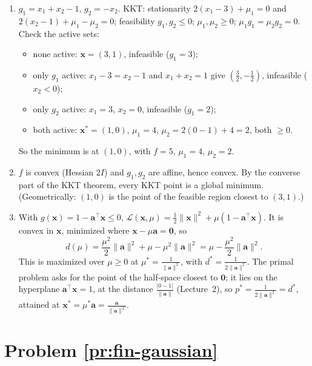 \documentclass[11pt]{article}
\newcommand{\norm}[1]{\lVert #1 \rVert}
\begin{document}
\begin{enumerate}[label=(\alph*)]
    \item $g_1 = x_1 + x_2 - 1$, $g_2 = -x_2$. KKT: stationarity $2(x_1 - 3) + \mu_1 = 0$ and $2(x_2 - 1) + \mu_1 - \mu_2 = 0$; feasibility $g_1, g_2 \leq 0$; $\mu_1, \mu_2 \geq 0$; $\mu_1g_1 = \mu_2g_2 = 0$. Check the active sets:
    \begin{itemize}
        \item none active: $\mathbf{x} = (3, 1)$, infeasible ($g_1 = 3$);
        \item only $g_1$ active: $x_1 - 3 = x_2 - 1$ and $x_1 + x_2 = 1$ give $(\frac{3}{2}, -\frac{1}{2})$, infeasible ($x_2 < 0$);
        \item only $g_2$ active: $x_1 = 3$, $x_2 = 0$, infeasible ($g_1 = 2$);
        \item both active: $\mathbf{x}^* = (1, 0)$, $\mu_1 = 4$, $\mu_2 = 2(0 - 1) + 4 = 2$, both $\geq 0$.
    \end{itemize}
    So the minimum is at $(1, 0)$, with $f = 5$, $\mu_1 = 4$, $\mu_2 = 2$.
    \item $f$ is convex (Hessian $2I$) and $g_1, g_2$ are affine, hence convex. By the converse part of the KKT theorem, every KKT point is a global minimum. (Geometrically: $(1, 0)$ is the point of the feasible region closest to $(3, 1)$.)
    \item With $g(\mathbf{x}) = 1 - \mathbf{a}^\top\mathbf{x} \leq 0$, $\mathcal{L}(\mathbf{x}, \mu) = \frac{1}{2}\norm{\mathbf{x}}^2 + \mu(1 - \mathbf{a}^\top\mathbf{x})$. It is convex in $\mathbf{x}$, minimized where $\mathbf{x} - \mu\mathbf{a} = \mathbf{0}$, so
    \[d(\mu) = \frac{\mu^2}{2}\norm{\mathbf{a}}^2 + \mu - \mu^2\norm{\mathbf{a}}^2 = \mu - \frac{\mu^2}{2}\norm{\mathbf{a}}^2.\]
    This is maximized over $\mu \geq 0$ at $\mu^* = \frac{1}{\norm{\mathbf{a}}^2}$, with $d^* = \frac{1}{2\norm{\mathbf{a}}^2}$. The primal problem asks for the point of the half-space closest to $\mathbf{0}$; it lies on the hyperplane $\mathbf{a}^\top\mathbf{x} = 1$, at the distance $\frac{|0 - 1|}{\norm{\mathbf{a}}}$ (Lecture~2), so $p^* = \frac{1}{2\norm{\mathbf{a}}^2} = d^*$, attained at $\mathbf{x}^* = \mu^*\mathbf{a} = \frac{\mathbf{a}}{\norm{\mathbf{a}}^2}$.
\end{enumerate}

\section*{Problem \ref{pr:fin-gaussian}}
\end{document}
